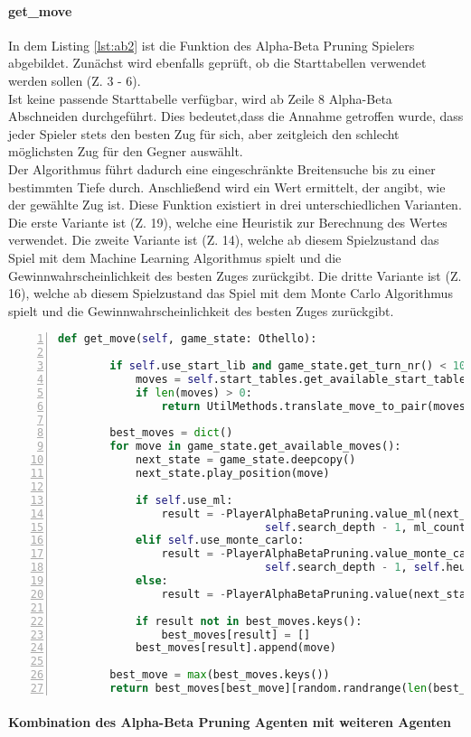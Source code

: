 \paragraph{get\_move}
In dem Listing \ref{lst:ab2} ist die  Funktion des Alpha-Beta Pruning Spielers abgebildet.
Zunächst wird ebenfalls geprüft, ob die Starttabellen verwendet werden sollen (Z. 3 - 6).
\\Ist keine passende Starttabelle verfügbar, wird ab Zeile 8 Alpha-Beta Abschneiden durchgeführt.
Dies bedeutet,dass die Annahme getroffen wurde, dass jeder Spieler stets den besten Zug für sich, aber zeitgleich den schlecht möglichsten Zug für den Gegner auswählt.
\\Der Algorithmus führt dadurch eine eingeschränkte Breitensuche bis zu einer bestimmten Tiefe durch.
Anschließend wird ein Wert ermittelt, der angibt, wie  der gewählte Zug ist.
Diese Funktion  existiert in drei unterschiedlichen Varianten.
Die erste Variante ist  (Z. 19), welche eine Heuristik zur Berechnung des Wertes verwendet.  
Die zweite Variante ist  (Z. 14), welche ab diesem Spielzustand das Spiel mit dem Machine Learning Algorithmus spielt und die Gewinnwahrscheinlichkeit des besten Zuges zurückgibt.
Die dritte Variante ist  (Z. 16), welche ab diesem Spielzustand das Spiel mit dem Monte Carlo Algorithmus spielt und die Gewinnwahrscheinlichkeit des besten Zuges zurückgibt.
\begin{lstlisting}[caption = {get\_move Funktion des Alpha-Beta Spielers}, language = python, captionpos = t , numbers=left, label={lst:ab2}]
    def get_move(self, game_state: Othello):

        if self.use_start_lib and game_state.get_turn_nr() < 10:  # check whether start move match
            moves = self.start_tables.get_available_start_tables(game_state)
            if len(moves) > 0:
                return UtilMethods.translate_move_to_pair(moves[random.randrange(len(moves))])
        
        best_moves = dict()
        for move in game_state.get_available_moves():
            next_state = game_state.deepcopy()
            next_state.play_position(move)

            if self.use_ml:
                result = -PlayerAlphaBetaPruning.value_ml(next_state, 
                				self.search_depth - 1, ml_count=self.ml_count)
            elif self.use_monte_carlo:
                result = -PlayerAlphaBetaPruning.value_monte_carlo(next_state, 
                				self.search_depth - 1, self.heuristic, mc_count=self.ml_count)
            else:
                result = -PlayerAlphaBetaPruning.value(next_state, self.search_depth - 1, self.heuristic)

            if result not in best_moves.keys():
                best_moves[result] = []
            best_moves[result].append(move)

        best_move = max(best_moves.keys())
        return best_moves[best_move][random.randrange(len(best_moves[best_move]))]
\end{lstlisting}

\paragraph{Kombination des Alpha-Beta Pruning Agenten mit weiteren Agenten}
\label{ab_comb}
